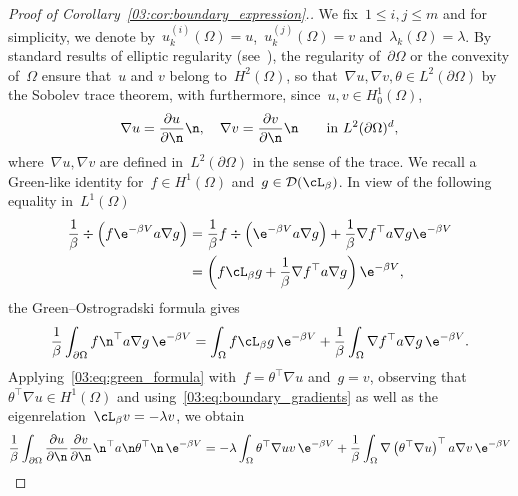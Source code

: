 \begin{proof}[Proof of Corollary~\ref{03:cor:boundary_expression}.]
    We fix~$1\leq i,j\leq m$ and for simplicity, we denote by~$u_k^{(i)}(\Omega)=u$,~$u_k^{(j)}(\Omega)=v$ and~$\lambda_k(\Omega)=\lambda$. By standard results of elliptic regularity (see~\cite[Theorems 2.4.2.5 and~3.2.1.3]{G11}), the regularity of~$\partial\Omega$ or the convexity of~$\Omega$ ensure that~$u$ and $v$ belong to~$H^2(\Omega)$, so that~$\nabla u,\nabla v,\theta \in L^2(\partial\Omega)$ by the Sobolev trace theorem,
    with furthermore, since~$u,v\in H_0^1(\Omega)$,
    \begin{equation}
        \label{03:eq:boundary_gradients}
        \nabla u = \frac{\partial u}{\partial \n}\n,\quad \nabla v = \frac{\partial v}{\partial\n}\n\qquad \text{in } L^2(\partial\Omega)^d,
    \end{equation}
    where~$\nabla u,\nabla v$ are defined in~$L^2(\partial\Omega)$ in the sense of the trace.
    We recall a Green-like identity for~$f\in H^1(\Omega)$ and~$g\in\mathcal D(\cL_\beta)$. In view of the following equality in~$L^1(\Omega)$
    \begin{equation}
        \begin{aligned}
            \frac1\beta\div\left(f\e^{-\beta V}a\nabla g\right) &= \frac1\beta f\div\left(\e^{-\beta V}a\nabla g\right) + \frac1\beta \nabla f^\top a \nabla g\e^{-\beta V}\\
            &= \left(f\cL_\beta g + \frac1\beta\nabla f^\top a \nabla g\right)\e^{-\beta V},
        \end{aligned}
    \end{equation}
    the Green--Ostrogradski formula gives
    \begin{equation}
        \label{03:eq:green_formula}
        \frac1\beta\int_{\partial \Omega} f\n^\top a\nabla g\,\e^{-\beta V} = \int_{\Omega}f\cL_\beta g\,\e^{-\beta V} + \frac1\beta\int_\Omega\nabla f^\top a \nabla g\,\e^{-\beta V}.
    \end{equation}
    Applying~\eqref{03:eq:green_formula} with~$f=\theta^\top \nabla u$ and~$g=v$, observing that~$\theta^\top\nabla u\in H^1(\Omega)$ and using~\eqref{03:eq:boundary_gradients} as well as the eigenrelation~$\cL_\beta v = -\lambda v$, we obtain
    \begin{equation}
        \begin{aligned}
        \frac1\beta\int_{\partial\Omega}\frac{\partial u}{\partial \n}\frac{\partial v}{\partial\n}\n^\top a\n \theta^\top\n\,\e^{-\beta V} &= -\lambda\int_{\Omega}\theta^\top\nabla u v\,\e^{-\beta V} + \frac1\beta\int_{\Omega}\nabla\left(\theta^\top\nabla u\right)^\top a \nabla v\,\e^{-\beta V}\\

\end{aligned}
\end{equation}
\end{proof}
